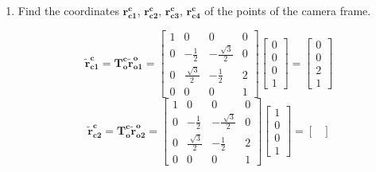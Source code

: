 \documentclass[12pt, letterpaper]{article}
\begin{document}
\begin{enumerate}
    \renewcommand{\labelenumi}{\alph{enumi})}
    \item Find the coordinates $\bm{r_{c1}^c}$, $\bm{r_{c2}^c}$, $\bm{r_{c3}^c}$, 
        $\bm{r_{c4}^c}$ of the points of the camera frame.

        \begin{equation*}
            \bm{\tilde{r}^c_{c1}=T_o^c\tilde{r}^{o}_{o1}}=
            \begin{bmatrix}
                1 & 0 & 0 & 0\\
                0 & -\frac{1}{2} & -\frac{\sqrt[]{3}}{2} & 0\\
                0 & \frac{\sqrt[]{3}}{2} & -\frac{1}{2} & 2\\
                0 & 0 & 0 & 1
            \end{bmatrix}
                \begin{bmatrix}
                    0\\
                    0\\
                    0\\
                    1
                \end{bmatrix}=
                \begin{bmatrix}
                    0\\
                    0\\
                    2\\
                    1
                \end{bmatrix}
        \end{equation*}
        \begin{equation*}
            \bm{\tilde{r}^c_{c2}=T_o^c\tilde{r}^{o}_{o2}}=
            \begin{bmatrix}
                1 & 0 & 0 & 0\\
                0 & -\frac{1}{2} & -\frac{\sqrt[]{3}}{2} & 0\\
                0 & \frac{\sqrt[]{3}}{2} & -\frac{1}{2} & 2\\
                0 & 0 & 0 & 1
            \end{bmatrix}
                \begin{bmatrix}
                    1\\
                    0\\
                    0\\
                    1
                \end{bmatrix}=
                \begin{bmatrix}

\end{bmatrix}
\end{equation*}
\end{enumerate}
\end{document}
